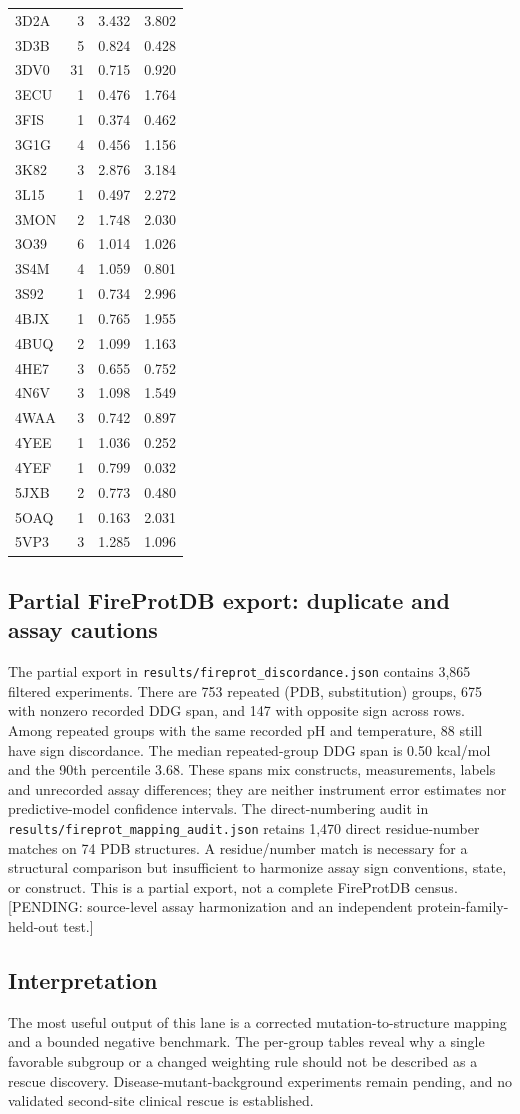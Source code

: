 \begin{longtable}{lrrr}
3D2A & 3 & 3.432 & 3.802\\
3D3B & 5 & 0.824 & 0.428\\
3DV0 & 31 & 0.715 & 0.920\\
3ECU & 1 & 0.476 & 1.764\\
3FIS & 1 & 0.374 & 0.462\\
3G1G & 4 & 0.456 & 1.156\\
3K82 & 3 & 2.876 & 3.184\\
3L15 & 1 & 0.497 & 2.272\\
3MON & 2 & 1.748 & 2.030\\
3O39 & 6 & 1.014 & 1.026\\
3S4M & 4 & 1.059 & 0.801\\
3S92 & 1 & 0.734 & 2.996\\
4BJX & 1 & 0.765 & 1.955\\
4BUQ & 2 & 1.099 & 1.163\\
4HE7 & 3 & 0.655 & 0.752\\
4N6V & 3 & 1.098 & 1.549\\
4WAA & 3 & 0.742 & 0.897\\
4YEE & 1 & 1.036 & 0.252\\
4YEF & 1 & 0.799 & 0.032\\
5JXB & 2 & 0.773 & 0.480\\
5OAQ & 1 & 0.163 & 2.031\\
5VP3 & 3 & 1.285 & 1.096\\
\hline\end{longtable}
\subsection{Partial FireProtDB export: duplicate and assay cautions}
The partial export in \texttt{results/fireprot\_discordance.json} contains 3,865 filtered experiments. There are 753 repeated (PDB, substitution) groups, 675 with nonzero recorded DDG span, and 147 with opposite sign across rows. Among repeated groups with the same recorded pH and temperature, 88 still have sign discordance. The median repeated-group DDG span is 0.50 kcal/mol and the 90th percentile 3.68. These spans mix constructs, measurements, labels and unrecorded assay differences; they are neither instrument error estimates nor predictive-model confidence intervals.
The direct-numbering audit in \texttt{results/fireprot\_mapping\_audit.json} retains 1,470 direct residue-number matches on 74 PDB structures. A residue/number match is necessary for a structural comparison but insufficient to harmonize assay sign conventions, state, or construct. This is a partial export, not a complete FireProtDB census. [PENDING: source-level assay harmonization and an independent protein-family-held-out test.]
\subsection{Interpretation}
The most useful output of this lane is a corrected mutation-to-structure mapping and a bounded negative benchmark. The per-group tables reveal why a single favorable subgroup or a changed weighting rule should not be described as a rescue discovery. Disease-mutant-background experiments remain pending, and no validated second-site clinical rescue is established.

